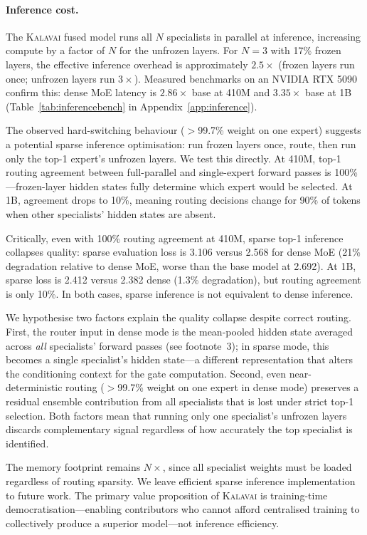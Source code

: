 \documentclass{article}
\newcommand{\kalavai}{\textsc{Kalavai}\xspace}
\begin{document}
\paragraph{Inference cost.} The \kalavai fused model runs all $N$ specialists in parallel at inference, increasing compute by a factor of $N$ for the unfrozen layers. For $N=3$ with 17\% frozen layers, the effective inference overhead is approximately $2.5\times$ (frozen layers run once; unfrozen layers run $3\times$). Measured benchmarks on an NVIDIA RTX 5090 confirm this: dense MoE latency is $2.86\times$ base at 410M and $3.35\times$ base at 1B (Table~\ref{tab:inferencebench} in Appendix~\ref{app:inference}).

The observed hard-switching behaviour ($>$99.7\% weight on one expert) suggests a potential sparse inference optimisation: run frozen layers once, route, then run only the top-1 expert's unfrozen layers. We test this directly. At 410M, top-1 routing agreement between full-parallel and single-expert forward passes is 100\%---frozen-layer hidden states fully determine which expert would be selected. At 1B, agreement drops to 10\%, meaning routing decisions change for 90\% of tokens when other specialists' hidden states are absent.

Critically, even with 100\% routing agreement at 410M, sparse top-1 inference collapses quality: sparse evaluation loss is 3.106 versus 2.568 for dense MoE (21\% degradation relative to dense MoE, worse than the base model at 2.692). At 1B, sparse loss is 2.412 versus 2.382 dense (1.3\% degradation), but routing agreement is only 10\%. In both cases, sparse inference is not equivalent to dense inference.

We hypothesise two factors explain the quality collapse despite correct routing. First, the router input in dense mode is the mean-pooled hidden state averaged across \emph{all} specialists' forward passes (see footnote~3); in sparse mode, this becomes a single specialist's hidden state---a different representation that alters the conditioning context for the gate computation. Second, even near-deterministic routing ($>$99.7\% weight on one expert in dense mode) preserves a residual ensemble contribution from all specialists that is lost under strict top-1 selection. Both factors mean that running only one specialist's unfrozen layers discards complementary signal regardless of how accurately the top specialist is identified.

The memory footprint remains $N\times$, since all specialist weights must be loaded regardless of routing sparsity. We leave efficient sparse inference implementation to future work. The primary value proposition of \kalavai is training-time democratisation---enabling contributors who cannot afford centralised training to collectively produce a superior model---not inference efficiency.
\end{document}
